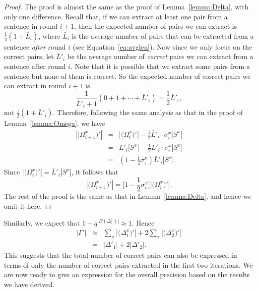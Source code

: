 \documentclass[10pt,journal,cspaper,compsoc]{IEEEtran}
\begin{document}
\begin{proof}
The proof is almost the same as the proof of Lemma~\ref{lemma:Delta}, with only one difference. Recall that, if we can extract at least one pair from a sentence in round $i+1$, then the expected number of pairs we can extract is $\frac{1}{2}(1+\bar{L}_i)$, where $\bar{L}_i$ is the average number of pairs that can be extracted from a sentence \emph{after} round $i$ (see Equation~\ref{eq:avglen}). Now since we only focus on the correct pairs, let $\bar{L}'_i$ be the average number of \emph{correct} pairs we can extract from a sentence after round $i$. Note that it is possible that we extract some pairs from a sentence but none of them is correct. So the expected number of correct pairs we can extract in round $i+1$ is
\begin{equation}
\frac{1}{\bar{L}'_i+1}(0+1+\cdots+\bar{L}'_i)=\frac{1}{2}\bar{L}'_i,
\end{equation}
not $\frac{1}{2}(1+\bar{L}'_i)$. Therefore, following the same analysis as that in the proof of Lemma~\ref{lemma:Omega}, we have
\begin{eqnarray}
|\big(\Omega_{i+1}^x\big)'|&=&|\big(\Omega_i^x\big)'|-\frac{1}{2}\bar{L}'_i\cdot\sigma_i^x|S^x|\\\nonumber
&=&\bar{L}'_i|S^x|-\frac{1}{2}\bar{L}'_i\cdot\sigma_i^x|S^x|\\\nonumber
&=&(1-\frac{1}{2}\sigma_i^x)\bar{L}'_i|S^x|.
\end{eqnarray}
Since $|\big(\Omega_i^x\big)'|=\bar{L}'_i|S^x|$, it follows that
\begin{equation}
|\big(\Omega_{i+1}^x\big)'|=\big[1-\frac{1}{2}\sigma_i^x\big]|\big(\Omega_i^x\big)'|.
\end{equation}
The rest of the proof is the same as that in Lemma~\ref{lemma:Delta}, and hence we omit it here.
\end{proof}

Similarly, we expect that $1-q^{|D(\Delta_1^x)|}\approx 1$. Hence
\begin{eqnarray}
|\Gamma'|&\approx&\sum_x|\big(\Delta_1^x\big)'| + 2\sum_x|\big(\Delta_2^x\big)'|\\\nonumber
&=&|\Delta'_1|+2|\Delta'_2|.
\end{eqnarray}
This suggests that the total number of correct pairs can also be expressed in terms of only the number of correct pairs extracted in the first two iterations. We are now ready to give an expression for the overall precision based on the results we have derived.
\end{document}
